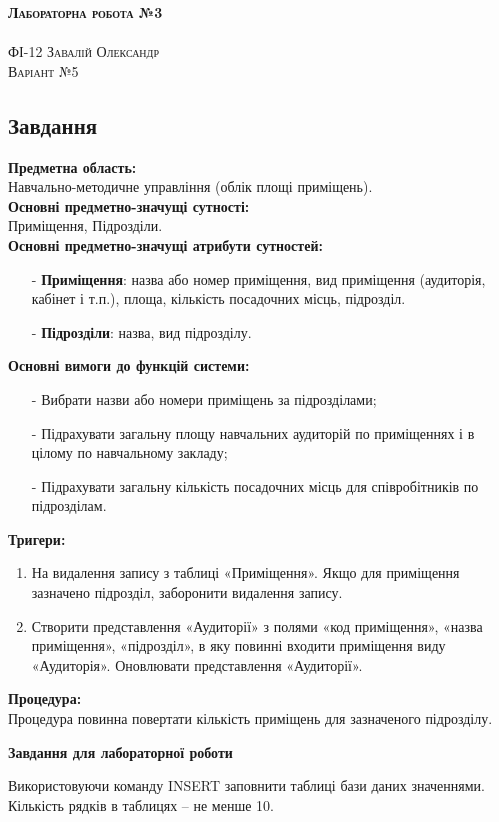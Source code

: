 \documentclass[a4paper,12pt]{article}
\begin{document}
	
	\begin{center}
		{\Large \bfseries \textsc{Лабораторна робота №3}}\\
		\hrulefill\\
		\Large \textsc{ФІ-12 Завалій Олександр\\ Варіант №5}
	\end{center}
	\begin{center}
		\section*{\bfseries{Завдання}}
	\end{center} 
	\textbf{Предметна область:} \\
	Навчально-методичне управління (облік площі приміщень). \\
	\textbf{Основні предметно-значущі сутності:} \\
	Приміщення, Підрозділи. \\
	\textbf{Основні предметно-значущі атрибути сутностей:}
	\begin{enumerate}
		\item[-] \textbf{Приміщення}: назва або номер приміщення, вид приміщення (аудиторія, кабінет і т.п.), площа, кількість посадочних місць, підрозділ. 
		\item[-] \textbf{Підрозділи}: назва, вид підрозділу.
	\end{enumerate}
	\textbf{Основні вимоги до функцій системи:}
	\begin{enumerate}
		\item[-] Вибрати назви або номери приміщень за підрозділами;
		\item[-] Підрахувати загальну площу навчальних аудиторій по приміщеннях і в цілому по навчальному закладу;
		\item[-] Підрахувати загальну кількість посадочних місць для співробітників по підрозділам.
	\end{enumerate}
	\textbf{Тригери:}
	\begin{enumerate}
		\item На видалення запису з таблиці «Приміщення». Якщо для приміщення зазначено підрозділ, заборонити видалення запису.
		\item Створити представлення «Аудиторії» з полями «код приміщення», «назва приміщення», «підрозділ», в яку повинні входити приміщення виду «Аудиторія». Оновлювати представлення «Аудиторії».
	\end{enumerate}
	\textbf{Процедура:}\\
	Процедура повинна повертати кількість приміщень для зазначеного підрозділу. \\
	\begin{center}
		\textbf{Завдання для лабораторної роботи}
	\end{center}
	Використовуючи команду INSERT заповнити таблиці бази даних значеннями. Кількість рядків в таблицях – не менше 10.
\end{document}
